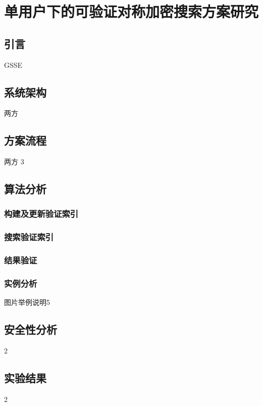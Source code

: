 \chapter{单用户下的可验证对称加密搜索方案研究}
\label{cha:single-user}
\section{引言} GSSE

\section{系统架构} 两方

\section{方案流程} 两方 3

\section{算法分析}
\subsection{构建及更新验证索引}
\subsection{搜索验证索引}
\subsection{结果验证}
\subsection{实例分析} 图片举例说明5

\section{安全性分析} 2

\section{实验结果} 2
